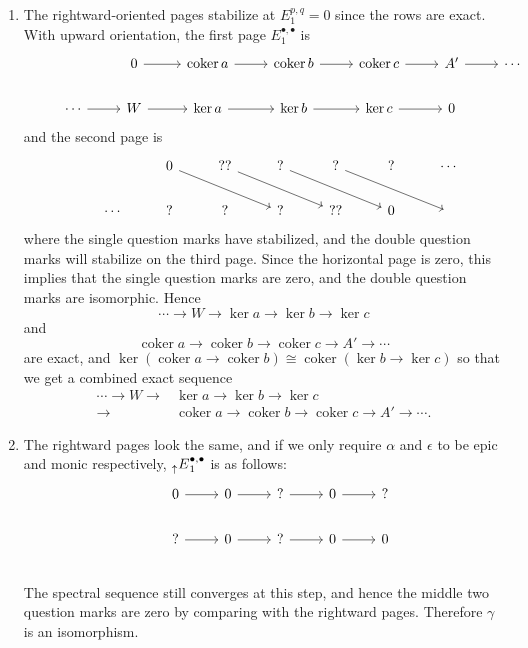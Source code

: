 \documentclass{report}
\DeclareMathOperator{\coker}{coker}
\begin{document}
\begin{enumerate}[label=\textbf{1.7.\Alph*.}]
	\item The rightward-oriented pages stabilize at $E^{p,q}_1=0$ since the rows
	      are exact. With upward orientation, the first page
	      $E^{\bullet,\bullet}_1$ is
	      \begin{equation*}
		      \begin{tikzcd}
			      & &0 \ar[r] &\coker a \ar[r] &\coker b \ar[r] &\coker c \ar[r] &A' \ar[r] &\cdots \\
			      &\cdots \ar[r] &W \ar[r] &\ker a \ar[r] &\ker b \ar[r] &\ker c \ar[r] &0
		      \end{tikzcd}
	      \end{equation*}
	      and the second page is
	      \begin{equation*}
		      \begin{tikzcd}
			      & &0 \ar[drr] &?? \ar[drr] &? \ar[drr] &? \ar[drr] &? &\cdots \\
			      &\cdots &? &? &? &?? &0 &~
		      \end{tikzcd}
	      \end{equation*}
	      where the single question marks have stabilized, and the double question
	      marks will stabilize on the third page. Since the horizontal page is
	      zero, this implies that the single question marks are zero, and the
	      double question marks are isomorphic. Hence
	      \begin{equation*}
		      \cdots\to W\to\ker a\to\ker b\to\ker c
	      \end{equation*}
	      and
	      \begin{equation*}
		      \coker a\to\coker b\to\coker c\to A'\to\cdots
	      \end{equation*}
	      are exact, and $\ker(\coker a\to\coker b)\cong\coker(\ker b\to\ker c)$
	      so that we get a combined exact sequence
	      \begin{align*}
		      \cdots\to W\to & \ker a\to\ker b\to\ker c                       \\
		      \to            & \coker a\to\coker b\to\coker c\to A'\to\cdots.
	      \end{align*}

	\item The rightward pages look the same, and if we only require $\alpha$ and
	      $\epsilon$ to be epic and monic respectively,
	      $\prescript{}{\uparrow}E^{\bullet,\bullet}_1$ is as follows:
	      \begin{equation*}
		      \begin{tikzcd}
			      &0 \ar[r] &0 \ar[r] &? \ar[r] &0 \ar[r] &? \\
			      &? \ar[r] &0 \ar[r] &? \ar[r] &0 \ar[r] &0 \\
		      \end{tikzcd}
	      \end{equation*}
	      The spectral sequence still converges at this step, and hence the middle
	      two question marks are zero by comparing with the rightward pages.
	      Therefore $\gamma$ is an isomorphism.


\end{enumerate}
\end{document}
